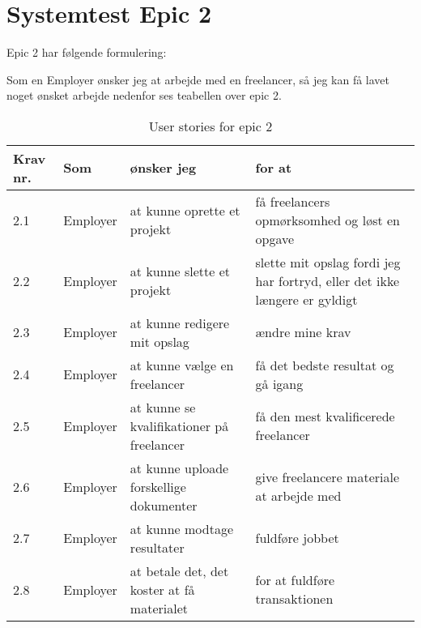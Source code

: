 
\chapter{Systemtest Epic 2}
Epic 2 har følgende formulering:

Som en Employer ønsker jeg at arbejde med en freelancer, så jeg kan få lavet noget ønsket arbejde
nedenfor ses teabellen over epic 2.


\begin{table}[H]
    \centering
    \caption{User stories for epic 2}
    \label{tab:us-epic2}
    \begin{tabular}{p{1cm}|p{2cm}|p{6cm}|p{6cm}}
        \textbf{Krav nr.} & \textbf{Som} & \textbf{ønsker jeg}                        & \textbf{for at}                                                                                     \\
        \hline
        2.1               & Employer     & at kunne oprette et projekt                & få freelancers opmørksomhed og løst en opgave                                                       \\
        \hline
        2.2               & Employer     & at kunne slette et projekt                 & \multicolumn{1}{p{6cm}}{slette mit opslag fordi jeg har fortryd, eller det ikke længere er gyldigt} \\
        \hline
        2.3               & Employer     & at kunne redigere mit opslag               & ændre mine krav                                                                                     \\
        \hline
        2.4               & Employer     & at kunne vælge en freelancer               & få det bedste resultat og gå igang                                                                  \\
        \hline
        2.5               & Employer     & at kunne se kvalifikationer på freelancer  & få den mest kvalificerede freelancer                                                                \\
        \hline
        2.6               & Employer     & at kunne uploade forskellige dokumenter    & give freelancere materiale at arbejde med                                                           \\
        \hline
        2.7               & Employer     & at kunne modtage resultater                & fuldføre jobbet                                                                                     \\
        \hline
        2.8               & Employer     & at betale det, det koster at få materialet & for at fuldføre transaktionen                                                                       \\
    \end{tabular}
\end{table}

